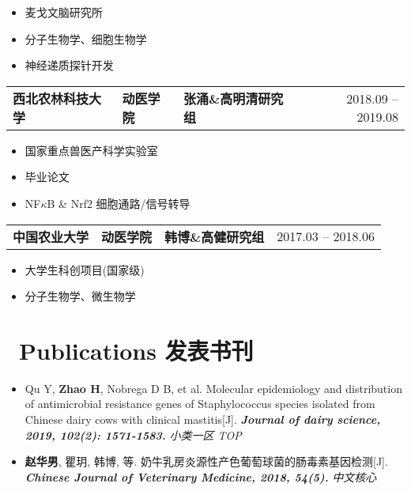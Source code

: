 \documentclass{resume}
\begin{document}
			\begin{itemize}
					\item 麦戈文脑研究所
					\item 分子生物学、细胞生物学
					\item 神经递质探针开发
			\end{itemize}

	\begin{tabularx}{\textwidth}{@{}X X X r@{}}
			\textbf{西北农林科技大学} & \textbf{动医学院} & \textbf{张涌\&高明清研究组} & 2018.09 -- 2019.08 \\
	\end{tabularx}

			\begin{itemize}
					\item 国家重点兽医产科学实验室
					\item 毕业论文
					\item NF$\kappa$B \& Nrf2 细胞通路/信号转导
			\end{itemize}

	\begin{tabularx}{\textwidth}{@{}X X X r@{}}
			\textbf{中国农业大学} & \textbf{动医学院} & \textbf{韩博\&高健研究组} & 2017.03 -- 2018.06 \\
	\end{tabularx}

			\begin{itemize}
					\item 大学生科创项目(国家级)
					\item 分子生物学、微生物学
			\end{itemize}

		
	\section{\faGraduationCap\ Publications 发表书刊}

	\begin{itemize}
	  \item Qu Y, \textbf{Zhao H}, Nobrega D B, et al. Molecular epidemiology and distribution of antimicrobial resistance genes of Staphylococcus species isolated from Chinese dairy cows with clinical mastitis[J].
			  \textit{ \textbf{Journal of dairy science, 2019, 102(2): 1571-1583.}	}
			  \textit{小类一区 TOP} 
	  
	  \item \textbf{赵华男}, 瞿玥, 韩博, 等. 奶牛乳房炎源性产色葡萄球菌的肠毒素基因检测[J]. 
			  \textit{\textbf{Chinese Journal of Veterinary Medicine, 2018, 54(5).}}
			  \textit{中文核心} 
	\end{itemize}
	
\end{document}

